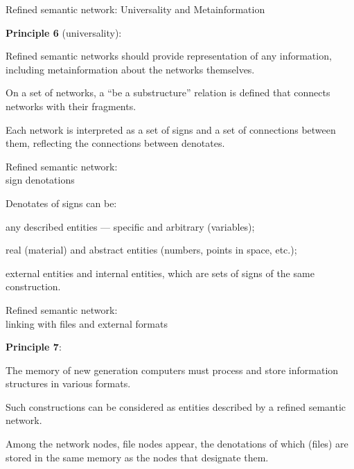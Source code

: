 \begin{frame}{Refined semantic network: Universality and Metainformation}
	\topline
	\justifying
	
	\textbf{Principle 6} (universality):
	\begin{textitemize}
		\item Refined semantic networks should provide representation of any information, including metainformation about the networks themselves.
		\item On a set of networks, a ``be a substructure'' relation is defined that connects networks with their fragments.
		\item Each network is interpreted as a set of signs and a set of connections between them, reflecting the connections between denotates.
	\end{textitemize}
	
\end{frame}


\begin{frame}{Refined semantic network:\\sign denotations}
	\topline
	\justifying
	
	Denotates of signs can be:
	\begin{textitemize}
		\item any described entities --- specific and arbitrary (variables);
		\item real (material) and abstract entities (numbers, points in space, etc.);
		\item external entities and internal entities, which are sets of signs of the same construction.
	\end{textitemize}
	
\end{frame}


\begin{frame}{Refined semantic network:\\linking with files and external formats}
	\topline
	\justifying
	
	\textbf{Principle 7}:
	\begin{textitemize}
		\item The memory of new generation computers must process and store information structures in various formats.
		\item Such constructions can be considered as entities described by a refined semantic network.
		\item Among the network nodes, file nodes appear, the denotations of which (files) are stored in the same memory as the nodes that designate them.
	\end{textitemize}
	
\end{frame}


